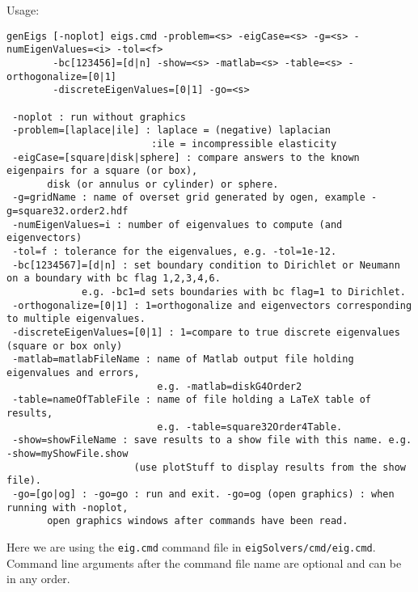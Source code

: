 \documentclass[preprint,11pt]{elsarticle}
\begin{document}
\mni
Usage: 
\begin{Verbatim}[fontsize=\footnotesize]
genEigs [-noplot] eigs.cmd -problem=<s> -eigCase=<s> -g=<s> -numEigenValues=<i> -tol=<f> 
        -bc[123456]=[d|n] -show=<s> -matlab=<s> -table=<s> -orthogonalize=[0|1] 
        -discreteEigenValues=[0|1] -go=<s>

 -noplot : run without graphics
 -problem=[laplace|ile] : laplace = (negative) laplacian
                         :ile = incompressible elasticity
 -eigCase=[square|disk|sphere] : compare answers to the known eigenpairs for a square (or box),
       disk (or annulus or cylinder) or sphere.
 -g=gridName : name of overset grid generated by ogen, example -g=square32.order2.hdf
 -numEigenValues=i : number of eigenvalues to compute (and eigenvectors)
 -tol=f : tolerance for the eigenvalues, e.g. -tol=1e-12.
 -bc[1234567]=[d|n] : set boundary condition to Dirichlet or Neumann on a boundary with bc flag 1,2,3,4,6.
             e.g. -bc1=d sets boundaries with bc flag=1 to Dirichlet.
 -orthogonalize=[0|1] : 1=orthogonalize and eigenvectors corresponding to multiple eigenvalues.
 -discreteEigenValues=[0|1] : 1=compare to true discrete eigenvalues (square or box only)
 -matlab=matlabFileName : name of Matlab output file holding eigenvalues and errors,
                          e.g. -matlab=diskG4Order2
 -table=nameOfTableFile : name of file holding a LaTeX table of results, 
                          e.g. -table=square32Order4Table.
 -show=showFileName : save results to a show file with this name. e.g. -show=myShowFile.show 
                      (use plotStuff to display results from the show file). 
 -go=[go|og] : -go=go : run and exit. -go=og (open graphics) : when running with -noplot, 
       open graphics windows after commands have been read.                       
\end{Verbatim}
Here we are using the \texttt{eig.cmd} command file in \texttt{eigSolvers/cmd/eig.cmd}.
Command line arguments after the command file name are optional and can be in any order.
\end{document}
